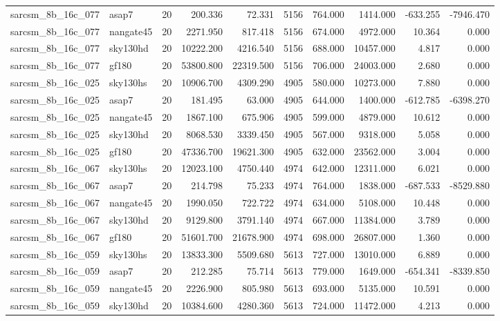 \documentclass{article}
\begin{document}
\begin{longtable}{llrrrrrrrr}
sarcsm\_8b\_16c\_077 & asap7 & 20 & 200.336 & 72.331 & 5156 & 764.000 & 1414.000 & -633.255 & -7946.470 \\
sarcsm\_8b\_16c\_077 & nangate45 & 20 & 2271.950 & 817.418 & 5156 & 674.000 & 4972.000 & 10.364 & 0.000 \\
sarcsm\_8b\_16c\_077 & sky130hd & 20 & 10222.200 & 4216.540 & 5156 & 688.000 & 10457.000 & 4.817 & 0.000 \\
sarcsm\_8b\_16c\_077 & gf180 & 20 & 53800.800 & 22319.500 & 5156 & 706.000 & 24003.000 & 2.680 & 0.000 \\
sarcsm\_8b\_16c\_025 & sky130hs & 20 & 10906.700 & 4309.290 & 4905 & 580.000 & 10273.000 & 7.880 & 0.000 \\
sarcsm\_8b\_16c\_025 & asap7 & 20 & 181.495 & 63.000 & 4905 & 644.000 & 1400.000 & -612.785 & -6398.270 \\
sarcsm\_8b\_16c\_025 & nangate45 & 20 & 1867.100 & 675.906 & 4905 & 599.000 & 4879.000 & 10.612 & 0.000 \\
sarcsm\_8b\_16c\_025 & sky130hd & 20 & 8068.530 & 3339.450 & 4905 & 567.000 & 9318.000 & 5.058 & 0.000 \\
sarcsm\_8b\_16c\_025 & gf180 & 20 & 47336.700 & 19621.300 & 4905 & 632.000 & 23562.000 & 3.004 & 0.000 \\
sarcsm\_8b\_16c\_067 & sky130hs & 20 & 12023.100 & 4750.440 & 4974 & 642.000 & 12311.000 & 6.021 & 0.000 \\
sarcsm\_8b\_16c\_067 & asap7 & 20 & 214.798 & 75.233 & 4974 & 764.000 & 1838.000 & -687.533 & -8529.880 \\
sarcsm\_8b\_16c\_067 & nangate45 & 20 & 1990.050 & 722.722 & 4974 & 634.000 & 5108.000 & 10.448 & 0.000 \\
sarcsm\_8b\_16c\_067 & sky130hd & 20 & 9129.800 & 3791.140 & 4974 & 667.000 & 11384.000 & 3.789 & 0.000 \\
sarcsm\_8b\_16c\_067 & gf180 & 20 & 51601.700 & 21678.900 & 4974 & 698.000 & 26807.000 & 1.360 & 0.000 \\
sarcsm\_8b\_16c\_059 & sky130hs & 20 & 13833.300 & 5509.680 & 5613 & 727.000 & 13010.000 & 6.889 & 0.000 \\
sarcsm\_8b\_16c\_059 & asap7 & 20 & 212.285 & 75.714 & 5613 & 779.000 & 1649.000 & -654.341 & -8339.850 \\
sarcsm\_8b\_16c\_059 & nangate45 & 20 & 2226.900 & 805.980 & 5613 & 693.000 & 5135.000 & 10.591 & 0.000 \\
sarcsm\_8b\_16c\_059 & sky130hd & 20 & 10384.600 & 4280.360 & 5613 & 724.000 & 11472.000 & 4.213 & 0.000 \\

\end{longtable}
\end{document}
